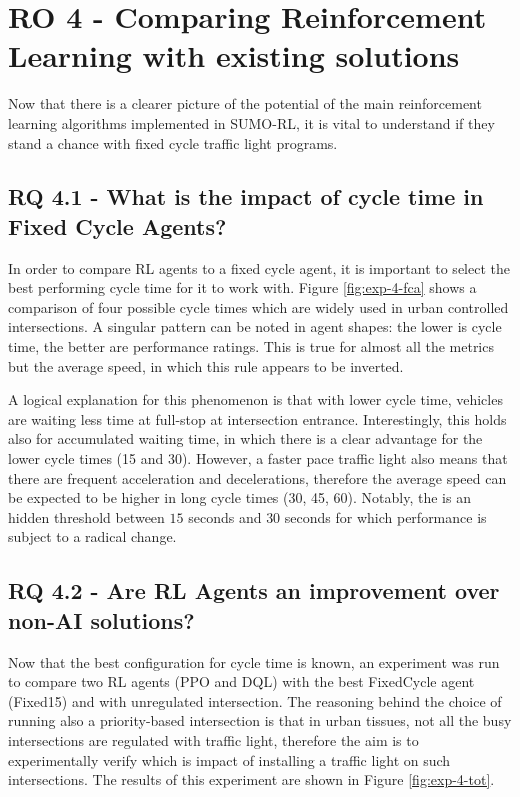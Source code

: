 
\section{RO 4 - Comparing Reinforcement Learning with existing solutions}

Now that there is a clearer picture of the potential of the main reinforcement learning algorithms implemented in SUMO-RL, it is vital to understand if they stand a chance with fixed cycle traffic light programs.

\subsection{RQ 4.1 - What is the impact of cycle time in Fixed Cycle Agents?}

In order to compare RL agents to a fixed cycle agent, it is important to select the best performing cycle time for it to work with. Figure \ref{fig:exp-4-fca} shows a comparison of four possible cycle times which are widely used in urban controlled intersections.
A singular pattern can be noted in agent shapes: the lower is cycle time, the better are performance ratings.
This is true for almost all the metrics but the average speed, in which this rule appears to be inverted.

A logical explanation for this phenomenon is that with lower cycle time, vehicles are waiting less time at full-stop at intersection entrance.
Interestingly, this holds also for accumulated waiting time, in which there is a clear advantage for the lower cycle times (15 and 30).
However, a faster pace traffic light also means that there are frequent acceleration and decelerations, therefore the average speed can be expected to be higher in long cycle times (30, 45, 60).
Notably, the is an hidden threshold between $15$ seconds and $30$ seconds for which performance is subject to a radical change.


\subsection{RQ 4.2 - Are RL Agents an improvement over non-AI solutions?}

Now that the best configuration for cycle time is known, an experiment was run to compare two RL agents (PPO and DQL) with the best FixedCycle agent (Fixed15) and with unregulated intersection.
The reasoning behind the choice of running also a priority-based intersection is that in urban tissues, not all the busy intersections are regulated with traffic light, therefore the aim is to experimentally verify which is impact of installing a traffic light on such intersections. The results of this experiment are shown in Figure \ref{fig:exp-4-tot}.

